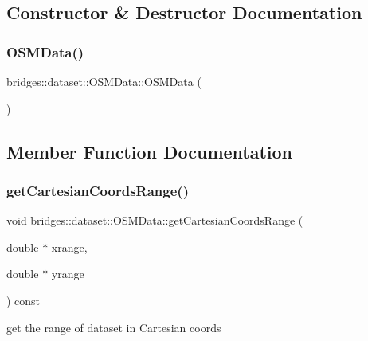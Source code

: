 \subsection{Constructor \& Destructor Documentation}
\mbox{\label{classbridges_1_1dataset_1_1_o_s_m_data_a53a8b50f2726dd90e7e0f78690abf121}} 
\subsubsection{\texorpdfstring{OSMData()}{OSMData()}}
{\footnotesize\ttfamily bridges\+::dataset\+::\+O\+S\+M\+Data\+::\+O\+S\+M\+Data (\begin{DoxyParamCaption}{ }\end{DoxyParamCaption})\hspace{0.3cm}{\ttfamily [inline]}}



\subsection{Member Function Documentation}
\mbox{\label{classbridges_1_1dataset_1_1_o_s_m_data_aa3341a32cd37df602b6f53f2e3cab92b}} 
\subsubsection{\texorpdfstring{getCartesianCoordsRange()}{getCartesianCoordsRange()}}
{\footnotesize\ttfamily void bridges\+::dataset\+::\+O\+S\+M\+Data\+::get\+Cartesian\+Coords\+Range (\begin{DoxyParamCaption}\item[{double $\ast$}]{xrange,  }\item[{double $\ast$}]{yrange }\end{DoxyParamCaption}) const\hspace{0.3cm}{\ttfamily [inline]}}



get the range of dataset in Cartesian coords 


